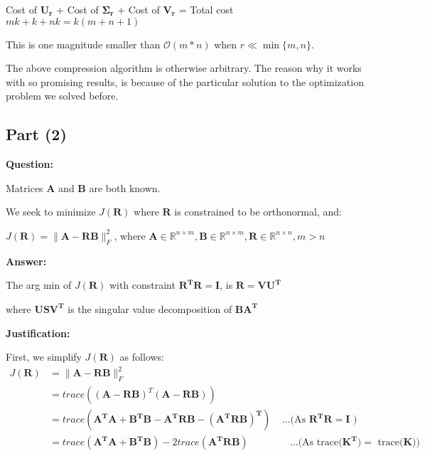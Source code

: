 \documentclass[fleqn, 11pt]{article}
\newcommand{\bs}[1]{\boldsymbol{#1}}
\begin{document}
\begin{center}
    Cost of $\bs{U_r}$ +  Cost of $\bs{\Sigma_r}$ +  Cost of $\bs{V_r}$  = Total cost \\
    $mk + k + nk = k (m+n+1)$
\end{center}

This is one magnitude smaller than $\mathcal{O}(m*n)$ when $r \ll \min\{m,n\}$. 

The above compression algorithm is otherwise arbitrary. 
The reason why it works with so promising results, is because of  
the particular solution to the optimization problem we solved before.



\newpage

\subsection*{Part (2) }

\textbf{Question: }

\smallskip

Matrices $\boldsymbol{A}$ and $\boldsymbol{B}$ are both known.

\smallskip

We seek to minimize $J(\boldsymbol{R})$ where  $\boldsymbol{R}$ is constrained to be orthonormal, and: 
\begin{center}
    $J(\boldsymbol{R}) = \|\boldsymbol{A}-\boldsymbol{R} \boldsymbol{B}\|^2_F$, where $\boldsymbol{A} \in \mathbb{R}^{n \times m}, \boldsymbol{B} \in \mathbb{R}^{n \times m}, \boldsymbol{R} \in \mathbb{R}^{n \times n}, m > n$ 

\end{center}
\hrulefill

\medskip

\textbf{Answer: }

\medskip

The arg min of $J(\boldsymbol{R})$ with constraint $\bs{R^TR=I}$,  
is $\bs{R=VU^T}$ 

\smallskip

where $\bs{USV^T}$ is the singular value decomposition of $\bs{BA^T}$

\hrulefill

\medskip

\textbf{Justification: }

\medskip


First, we simplify $J(\bs{R})$ as follows: 
\begin{align*}
    J(\boldsymbol{R}) &= \|\boldsymbol{A}-\boldsymbol{R} \boldsymbol{B}\|^2_F \\
    &= trace((\bs{A}-\bs{RB})^T (\bs{A}-\bs{RB}))  \\
    &= trace(\bs{A^TA + B^TB -  A^TRB - ( A^TRB  )^T  }) \;\;\;\; \ldots\text{(As $\bs{R^TR=I}$  )}\\
    &= trace(\bs{A^TA + B^TB}) - 2 trace(\bs{A^TRB}) \;\;\;\;\;\;\;\; \;\;\;\; \;\;\; 
    \ldots\text{(As trace($\bs{K^T})=$ trace($\bs{K}$))}\\
\end{align*}
\end{document}
